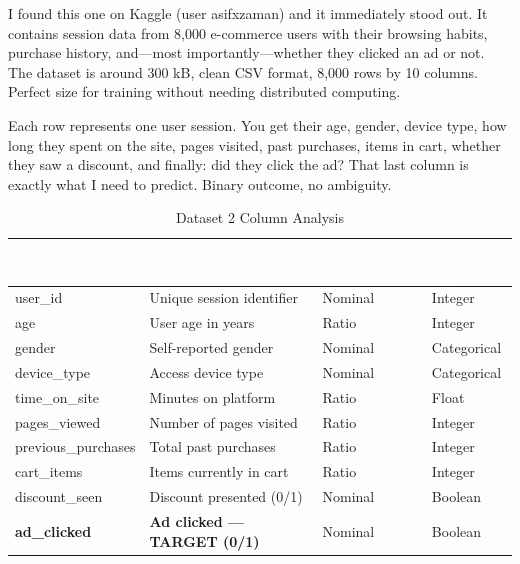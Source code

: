 \documentclass[11pt,a4paper]{article}
\begin{document}
I found this one on Kaggle (user asifxzaman) and it immediately stood out. It contains 
session data from 8,000 e-commerce users with their browsing habits, purchase history, 
and—most importantly—whether they clicked an ad or not. The dataset is around 300 kB, 
clean CSV format, 8,000 rows by 10 columns. Perfect size for training without needing 
distributed computing.

Each row represents one user session. You get their age, gender, device type, how long 
they spent on the site, pages visited, past purchases, items in cart, whether they saw 
a discount, and finally: did they click the ad? That last column is exactly what I need 
to predict. Binary outcome, no ambiguity.

\vspace{0.3cm}
\begin{table}[H]
\centering
\caption{Dataset 2 Column Analysis}
\small
\begin{tabular}{L{3.5cm} L{5cm} L{2cm} L{2cm}}
\toprule
{}
\textcolor{white}{\textbf{Column Name}} &
\textcolor{white}{\textbf{Description}} &
\textcolor{white}{\textbf{Measurement}} &
\textcolor{white}{\textbf{Data Type}} \\
\midrule
user\_id             & Unique session identifier      & Nominal & Integer \\
age                  & User age in years              & Ratio   & Integer \\
gender               & Self-reported gender           & Nominal & Categorical \\
device\_type         & Access device type             & Nominal & Categorical \\
time\_on\_site       & Minutes on platform            & Ratio   & Float \\
pages\_viewed        & Number of pages visited        & Ratio   & Integer \\
previous\_purchases  & Total past purchases           & Ratio   & Integer \\
cart\_items          & Items currently in cart        & Ratio   & Integer \\
discount\_seen       & Discount presented (0/1)       & Nominal & Boolean \\
\textbf{ad\_clicked} & \textbf{Ad clicked --- TARGET (0/1)} & Nominal & Boolean \\
\bottomrule
\end{tabular}
\end{table}
\end{document}
